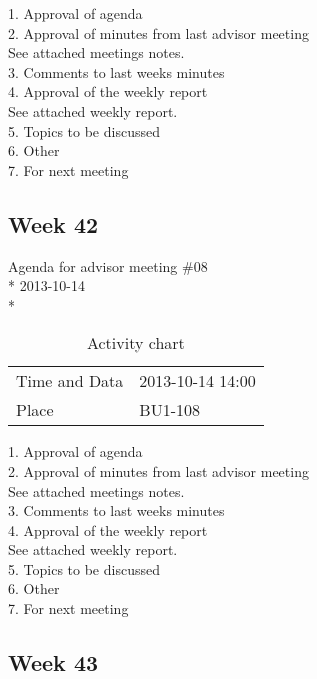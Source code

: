 1. Approval of agenda \\
2. Approval of minutes from last advisor meeting \\
See attached meetings notes. \\
3. Comments to last weeks minutes \\
4. Approval of the weekly report \\
See attached weekly report. \\
5. Topics to be discussed \\
6. Other \\
7. For next meeting \\

\newpage
\subsection{Week 42}

\begin{center}
Agenda for advisor meeting \#08\\*
2013-10-14\\*
\end{center}

\begin{table}[H]
\begin{center}
\begin{tabular}{ l | l }
Time and Data & 2013-10-14 14:00 \\
Place & BU1-108 \\
\end{tabular}
\end{center}
\caption{Activity chart}
\label{table:activityChartAdvisorAgendaWeek42}
\end{table}


1. Approval of agenda \\
2. Approval of minutes from last advisor meeting \\
See attached meetings notes. \\
3. Comments to last weeks minutes \\
4. Approval of the weekly report \\
See attached weekly report. \\
5. Topics to be discussed \\
6. Other \\
7. For next meeting \\

\newpage
\subsection{Week 43}

